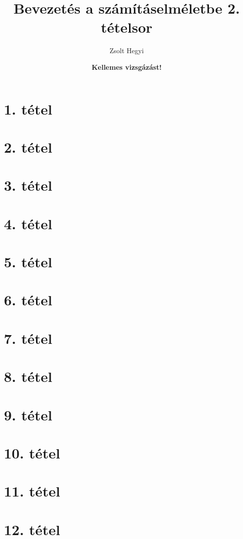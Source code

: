 \documentclass[8pt]{extarticle}
\title{Bevezetés a számításelméletbe 2. tételsor}
\author{Zsolt Hegyi}
\date{\textbf{Kellemes vizsgázást!}} %
\begin{document}
\maketitle
\tableofcontents
\newpage
\section{1. tétel}

\newpage
\section{2. tétel}

\newpage
\section{3. tétel}

\newpage
\section{4. tétel}

\newpage
\section{5. tétel}

\newpage
\section{6. tétel}

\newpage
\section{7. tétel}

\newpage
\section{8. tétel}

\newpage
\section{9. tétel}

\newpage
\section{10. tétel}

\newpage
\section{11. tétel}

\newpage
\section{12. tétel}

\newpage
\end{document}
